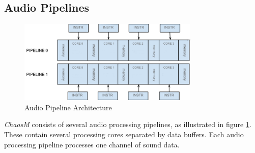 \FloatBarrier
\subsection{Audio Pipelines}\label{subsec:audio_pipelines}


\begin{figure}[H]
    \centering
    \includegraphics[height=150px]{figures/fpga/system_components_general_pipeline_without_programs.png}
    \caption{Audio Pipeline Architecture}
    \label{fig:pipeline_architecture}
\end{figure}

\textit{ChaosM} consists of several audio processing pipelines, as illustrated in
figure \ref{fig:pipeline_architecture}. These contain several processing cores
separated by data buffers. Each audio processing pipeline processes one channel
of sound data.

